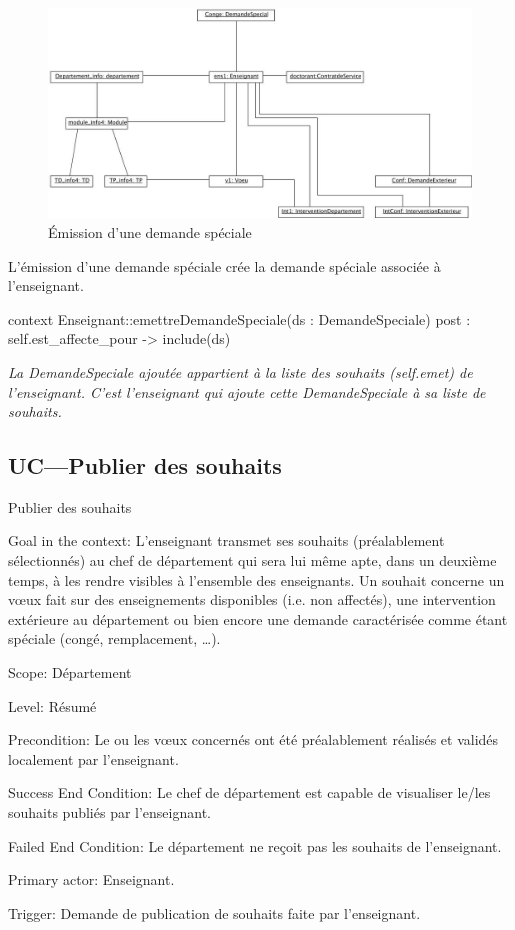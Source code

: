 \begin{ocl}
 \begin{figure}[!htbp]
 \begin{center}
 \includegraphics[width=14cm]{fig/7-EmissionSpecial.jpg}
 \caption{\'Emission d'une demande spéciale}
 \end{center}
 \end{figure}

 \indent L'émission d'une demande spéciale crée la demande spéciale associée à l'enseignant.

 \begin{ocl}
 context Enseignant::emettreDemandeSpeciale(ds : DemandeSpeciale)
 post : self.est_affecte_pour -> include(ds)
 \end{ocl}
 \emph{La DemandeSpeciale ajoutée appartient à la liste des souhaits (self.emet) de l'enseignant. C'est l'enseignant qui ajoute cette DemandeSpeciale à sa liste de souhaits.}



\subsection{UC---Publier des souhaits}
\begin{usecase}{Publier des souhaits}
\begin{information}
	\item[Goal in the context:] L'enseignant transmet ses souhaits (préalablement sélectionnés) au chef de département qui sera lui même apte, dans un deuxième temps, à les rendre visibles à l'ensemble des enseignants.
Un souhait concerne un vœux fait sur des enseignements disponibles (i.e. non affectés), une intervention extérieure au département ou bien encore une demande caractérisée comme étant spéciale (congé, remplacement, \dots). 
	\item[Scope:] Département
	\item[Level:] Résumé
	\item[Precondition:] Le ou les vœux concernés ont été préalablement réalisés et validés localement par l'enseignant.
	\item[Success End Condition:] Le chef de département est capable de visualiser le/les souhaits publiés par l'enseignant.
	\item[Failed End Condition:] Le département ne reçoit pas les souhaits de l'enseignant.
	\item[Primary actor:] Enseignant.
	\item[Trigger:] Demande de publication de souhaits faite par l'enseignant.
\end{information}
\end{usecase}



\end{ocl}
